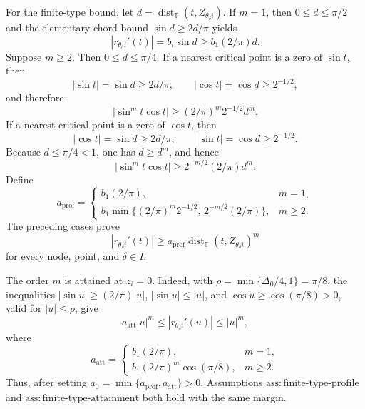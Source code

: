 For the finite-type bound, let \(d=\operatorname{dist}_{\mathbb T}(t,Z_{\theta_\delta i})\).  If \(m=1\), then \(0\leq d\leq\pi/2\) and the elementary chord bound \(\sin d\geq 2d/\pi\) yields
\[
 |r_{\theta_\delta i}'(t)|=b_i\sin d\geq b_1(2/\pi)d.
\]
Suppose \(m\geq2\).  Then \(0\leq d\leq\pi/4\).  If a nearest critical point is a zero of \(\sin t\), then
\[
 |\sin t|=\sin d\geq 2d/\pi,
 \qquad |\cos t|=\cos d\geq 2^{-1/2},
\]
and therefore
\[
 |\sin^m t\cos t|\geq (2/\pi)^m2^{-1/2}d^m.
\]
If a nearest critical point is a zero of \(\cos t\), then
\[
 |\cos t|=\sin d\geq 2d/\pi,
 \qquad |\sin t|=\cos d\geq2^{-1/2}.
\]
Because \(d\leq\pi/4<1\), one has \(d\geq d^m\), and hence
\[
 |\sin^m t\cos t|\geq 2^{-m/2}(2/\pi)d^m.
\]
Define
\[
 a_{\mathrm{prof}}=
 \begin{cases}
 b_1(2/\pi),&m=1,\\
 b_1\min\{(2/\pi)^m2^{-1/2},\,2^{-m/2}(2/\pi)\},&m\geq2.
 \end{cases}
\]
The preceding cases prove
\[
 |r_{\theta_\delta i}'(t)|\geq a_{\mathrm{prof}}
 \operatorname{dist}_{\mathbb T}(t,Z_{\theta_\delta i})^m
\]
for every node, point, and \(\delta\in I\).

The order \(m\) is attained at \(z_i=0\).  Indeed, with
\(\rho=\min\{\Delta_0/4,1\}=\pi/8\), the inequalities
\(|\sin u|\geq(2/\pi)|u|\), \(|\sin u|\leq |u|\), and
\(\cos u\geq\cos(\pi/8)>0\), valid for \(|u|\leq\rho\), give
\[
 a_{\mathrm{att}}|u|^m
 \leq |r_{\theta_\delta i}'(u)|
 \leq |u|^m,
\]
where
\[
 a_{\mathrm{att}}=
 \begin{cases}
 b_1(2/\pi),&m=1,\\
 b_1(2/\pi)^m\cos(\pi/8),&m\geq2.
 \end{cases}
\]
Thus, after setting \(a_0=\min\{a_{\mathrm{prof}},a_{\mathrm{att}}\}>0\), Assumptions \(\mathrm{ass:finite\text{-}type\text{-}profile}\) and \(\mathrm{ass:finite\text{-}type\text{-}attainment}\) both hold with the same margin.

